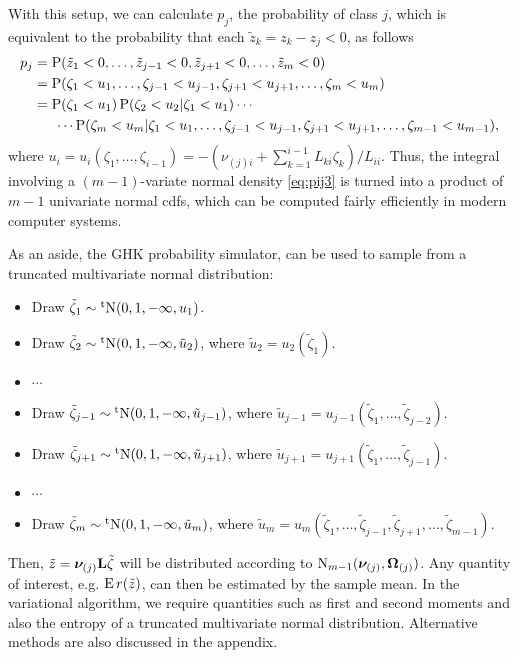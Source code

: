 With this setup, we can calculate $p_{j}$, the probability of class $j$, which is equivalent to the probability that each $\tilde z_k = z_k - z_j < 0$, as follows
\begin{align*}
  p_j 
  &= \operatorname{P}(\tilde z_1 < 0,\dots,\tilde z_{j-1} < 0, \tilde z_{j+1} < 0,\dots, \tilde z_m < 0) \\
  &= 
  \operatorname{P}(\zeta_1 < u_1,\dots,\zeta_{j-1}<u_{j-1},\zeta_{j+1}<u_{j+1},\dots,\zeta_{m}<u_{m}) \\
  &= 
  \operatorname{P}(\zeta_1 < u_1)
  \operatorname{P}(\zeta_2 < u_2|\zeta_1 < u_1)
  \cdots \\
  &\phantom{==}\cdots
  \operatorname{P}(\zeta_{m}<u_{m}|\zeta_1 < u_1,\dots,\zeta_{j-1}<u_{j-1},\zeta_{j+1}<u_{j+1},\dots,\zeta_{m-1}<u_{m-1}),
\end{align*}
where $u_i = u_i(\zeta_1,\dots,\zeta_{i-1}) = - (\nu_{(j)i} + \sum_{k=1}^{i-1} L_{ki}\zeta_k) / L_{ii}$.
Thus, the integral involving a $(m-1)$-variate normal density \cref{eq:pij3} is turned into a product of $m-1$ univariate normal cdfs, which can be computed fairly efficiently in modern computer systems.

As an aside, the GHK probability simulator, can be used to sample from a truncated multivariate normal distribution:
\begin{itemize}
  \item Draw $\tilde\zeta_1 \sim \operatorname{{}^tN}(0,1,-\infty,u_1)$.
  \item Draw $\tilde\zeta_2 \sim \operatorname{{}^tN}(0,1,-\infty,\tilde u_2)$, where $\tilde u_2 = u_2(\tilde\zeta_1)$.
  \item $\cdots$
  \item  Draw $\tilde\zeta_{j-1} \sim \operatorname{{}^tN}(0,1,-\infty,\tilde u_{j-1})$, where $\tilde u_{j-1} = u_{j-1}(\tilde\zeta_1,\dots,\tilde\zeta_{j-2})$.
  \item Draw $\tilde\zeta_{j+1} \sim \operatorname{{}^tN}(0,1,-\infty,\tilde u_{j+1})$, where $\tilde u_{j+1} = u_{j+1}(\tilde\zeta_1,\dots,\tilde\zeta_{j-1})$.
  \item $\cdots$
  \item Draw $\tilde\zeta_m \sim \operatorname{{}^tN}(0,1,-\infty,\tilde u_m)$, where $\tilde u_m = u_m(\tilde\zeta_1,\dots,\tilde\zeta_{j-1},\tilde\zeta_{j+1},\dots,\tilde\zeta_{m-1})$.
\end{itemize}
Then, $\tilde z = {\bm\nu}_{(j)} {\mathbf L}\tilde\zeta$ will be distributed according to $\operatorname{N}_{m-1}({\bm\nu}_{(j)},{\bm\Omega}_{(j)})$.
Any quantity of interest, e.g. $\operatorname{E} r(\tilde z)$, can then be estimated by the sample mean.
In the variational algorithm, we require quantities such as first and second moments and also the entropy of a truncated multivariate normal distribution.
Alternative methods are also discussed in the appendix.

